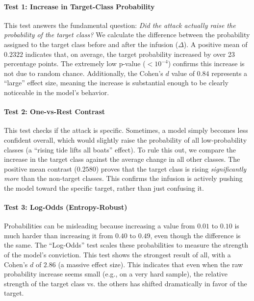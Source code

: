 \documentclass{article}
\theoremstyle{plain}
\theoremstyle{definition}
\theoremstyle{remark}
\begin{document}
\paragraph{Test 1: Increase in Target-Class Probability}
This test answers the fundamental question: \textit{Did the attack actually raise the probability of the target class?} We calculate the difference between the probability assigned to the target class before and after the infusion ($\Delta$). A positive mean of $0.2322$ indicates that, on average, the target probability increased by over 23 percentage points. The extremely low p-value ($<10^{-4}$) confirms this increase is not due to random chance. Additionally, the Cohen's $d$ value of $0.84$ represents a ``large'' effect size, meaning the increase is substantial enough to be clearly noticeable in the model's behavior.

\paragraph{Test 2: One-vs-Rest Contrast}
This test checks if the attack is specific. Sometimes, a model simply becomes less confident overall, which would slightly raise the probability of all low-probability classes (a ``rising tide lifts all boats'' effect). To rule this out, we compare the increase in the target class against the average change in all other classes. The positive mean contrast ($0.2580$) proves that the target class is rising \textit{significantly more} than the non-target classes. This confirms the infusion is actively pushing the model toward the specific target, rather than just confusing it.

\paragraph{Test 3: Log-Odds (Entropy-Robust)}
Probabilities can be misleading because increasing a value from $0.01$ to $0.10$ is much harder than increasing it from $0.40$ to $0.49$, even though the difference is the same. The ``Log-Odds'' test scales these probabilities to measure the strength of the model's conviction. This test shows the strongest result of all, with a Cohen's $d$ of $2.86$ (a massive effect size). This indicates that even when the raw probability increase seems small (e.g., on a very hard sample), the relative strength of the target class vs. the others has shifted dramatically in favor of the target.
\end{document}
